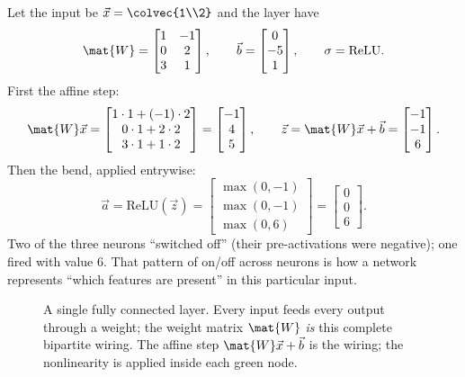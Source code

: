 Let the input be $\vec{x}=\colvec{1\\2}$ and the layer have
\[
\mat{W}=\begin{bmatrix} 1 & -1 \\ 0 & 2 \\ 3 & 1 \end{bmatrix},
\qquad
\vec{b}=\begin{bmatrix} 0 \\ -5 \\ 1 \end{bmatrix},
\qquad \sigma=\text{ReLU}.
\]
First the affine step:
\[
\mat{W}\vec{x}=\begin{bmatrix} 1\cdot1+(-1)\cdot2 \\ 0\cdot1+2\cdot2 \\ 3\cdot1+1\cdot2 \end{bmatrix}
=\begin{bmatrix} -1 \\ 4 \\ 5 \end{bmatrix},
\qquad
\vec{z}=\mat{W}\vec{x}+\vec{b}=\begin{bmatrix} -1 \\ -1 \\ 6 \end{bmatrix}.
\]
Then the bend, applied entrywise:
\[
\vec{a}=\text{ReLU}(\vec{z})=\begin{bmatrix} \max(0,-1) \\ \max(0,-1) \\ \max(0,6) \end{bmatrix}
=\begin{bmatrix} 0 \\ 0 \\ 6 \end{bmatrix}.
\]
Two of the three neurons ``switched off'' (their pre-activations were negative); one
fired with value $6$. That pattern of on/off across neurons is how a network represents
``which features are present'' in this particular input.

\begin{figure}[H]
\centering
{}
\caption{A single fully connected layer. Every input feeds every output through a weight;
the weight matrix $\mat{W}$ \emph{is} this complete bipartite wiring. The affine step
$\mat{W}\vec{x}+\vec{b}$ is the wiring; the nonlinearity is applied inside each green
node.}
\label{ch34:fig-layer}
\end{figure}

